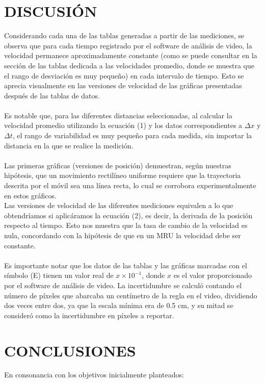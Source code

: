\documentclass[journal]{IEEEtran}
\begin{document}
\section{DISCUSIÓN}
Considerando cada una de las tablas generadas a partir de las mediciones, se observa que para cada tiempo registrado por el software de análisis de video, la velocidad permanece aproximadamente constante (como se puede consultar en la sección de las tablas dedicada a las velocidades promedio, donde se muestra que el rango de desviación es muy pequeño) en cada intervalo de tiempo. Esto se aprecia visualmente en las versiones de velocidad de las gráficas presentadas después de las tablas de datos.\\\\

Es notable que, para las diferentes distancias seleccionadas, al calcular la velocidad promedio utilizando la ecuación (1) y los datos correspondientes a \(\Delta x\) y \(\Delta t\), el rango de variabilidad es muy pequeño para cada medida, sin importar la distancia en la que se realice la medición.\\\\

Las primeras gráficas (versiones de posición) demuestran, según nuestras hipótesis, que un movimiento rectilíneo uniforme requiere que la trayectoria descrita por el móvil sea una línea recta, lo cual se corrobora experimentalmente en estos gráficos.\\

Las versiones de velocidad de las diferentes mediciones equivalen a lo que obtendríamos si aplicáramos la ecuación (2), es decir, la derivada de la posición respecto al tiempo. Esto nos muestra que la tasa de cambio de la velocidad es nula, concordando con la hipótesis de que en un MRU la velocidad debe ser constante.\\\\

Es importante notar que los datos de las tablas y las gráficas marcadas con el símbolo (E) tienen un valor real de \(x \times 10^{-1}\), donde \(x\) es el valor proporcionado por el software de análisis de video. La incertidumbre se calculó contando el número de píxeles que abarcaba un centímetro de la regla en el video, dividiendo dos veces entre dos, ya que la escala mínima era de 0.5 cm, y su mitad se consideró como la incertidumbre en píxeles a reportar.


\section{ CONCLUSIONES} 
En consonancia con los objetivos inicialmente planteados:\\
\end{document}
